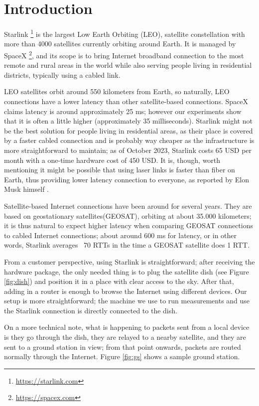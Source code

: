 \documentclass[IN,11pt,twoside,openright,idp,english]{tumthesis}
\begin{document}
\section{Introduction}
    
Starlink \footnote{\url{https://starlink.com}} is the largest Low Earth Orbiting (LEO), satellite constellation with more than 4000 satellites currently orbiting around Earth. It is managed by SpaceX \footnote{\url{https://spacex.com}}, and its scope is to bring Internet broadband connection to the most remote and rural areas in the world while also serving people living in residential districts, typically using a cabled link.
    
LEO satellites orbit around 550 kilometers from Earth, so naturally, LEO connections have a lower latency than other satellite-based connections. SpaceX claims latency is around approximately 25 ms; however our experiments show that it is often a little higher (approximately 35 milliseconds). 
Starlink might not be the best solution for people living in residential areas, as their place is covered by a faster cabled connection and is probably way cheaper as the infrastructure is more straightforward to maintain; as of October 2023, Starlink costs 65 USD per month with a one-time hardware cost of 450 USD. It is, though, worth mentioning it might be possible that using laser links is faster than fiber on Earth, thus providing lower latency connection to everyone, as reported by Elon Musk himself \cite{tweet}.

Satellite-based Internet connections have been around for several years. They are based on geostationary satellites(GEOSAT), orbiting at about 35.000 kilometers; it is thus natural to expect higher latency when comparing GEOSAT connections to cabled Internet connections; about around 600 ms for latency, or in other words, Starlink averages ~70 RTTs in the time a GEOSAT satellite does 1 RTT.
    
From a customer perspective, using Starlink is straightforward; after receiving the hardware package, the only needed thing is to plug the satellite dish (see Figure \ref{fig:dish}) and position it in a place with clear access to the sky. After that, adding in a router is enough to browse the Internet using different devices. Our setup is more straightforward; the machine we use to run measurements and use the Starlink connection is directly connected to the dish.
    
On a more technical note, what is happening to packets sent from a local device is they go through the dish, they are relayed to a nearby satellite, and they are sent to a ground station in view; from that point onwards, packets are routed normally through the Internet. Figure \ref{fig:gs} shows a sample ground station.
    
\end{document}
